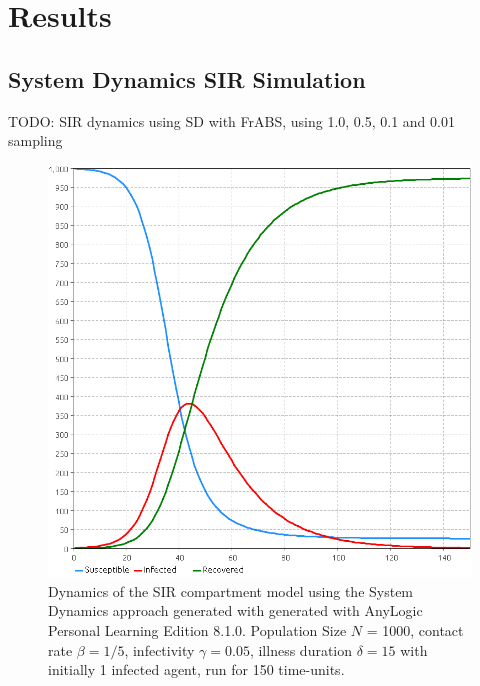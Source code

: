 \section{Results}

\subsection{System Dynamics SIR Simulation}
TODO: SIR dynamics using SD with FrABS, using 1.0, 0.5, 0.1 and 0.01 sampling 

\begin{figure}
	\centering
	\includegraphics[width=.4\textwidth, angle=0]{./../shared/fig/SIR_SD_DYNAMICS_ANYLOGIC.png}
	\caption{Dynamics of the SIR compartment model using the System Dynamics approach generated with generated with AnyLogic Personal Learning Edition 8.1.0. Population Size $N$ = 1000, contact rate $\beta = 1/5$, infectivity $\gamma = 0.05$, illness duration $\delta = 15$ with initially 1 infected agent, run for 150 time-units.}
	\label{fig:sir_sd_dynamics_anylogic}
\end{figure}


